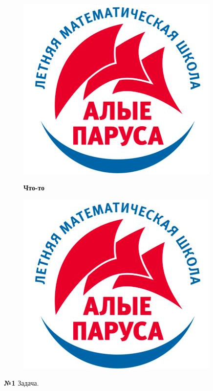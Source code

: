 \documentclass[12 pt, a4paper]{article}%
\newcommand{\task}[1]{{{\vspace{0.6cm} \vspace{-2ex} \textbf{№{#1}}  }}}
\begin{document}
	\begin{figure}[b]
		\begin{minipage}[h]{0.33\linewidth}
			\includegraphics[width=0.33\linewidth, left]{logo.jpg}
		\end{minipage}
		\begin{minipage}[h]{0.33\linewidth}
			\centering
			\large{\textbf{Что-то \Winkey}}
		\end{minipage}
		\begin{minipage}[h]{0.33\linewidth}
			\includegraphics[width=0.33\linewidth, right]{logo.jpg}
		\end{minipage}
		\label{ris:image1}
	\end{figure}
	
	

	
	\large
	\raggedright
	
	\task{1} Задача.
\end{document}
